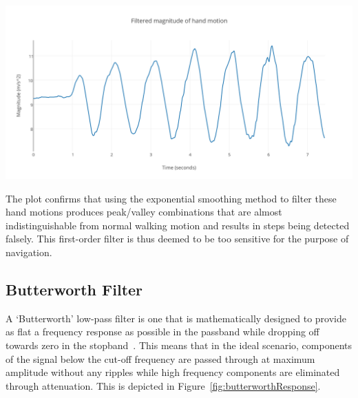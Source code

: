 \documentclass[12pt,a4paper,notitlepage]{report}
\begin{document}
\begin{center}
\includegraphics[scale=0.9]{images/complementaryFilterHandMotionMagnitude.png}
\label{fig:complementaryFilterHandMotionMagnitude}
\end{center}
The plot confirms that using the exponential smoothing method to filter these hand motions produces peak/valley combinations that are almost indistinguishable from normal walking motion and results in steps being detected falsely. This first-order filter is thus deemed to be too sensitive for the purpose of navigation. 

\subsection*{Butterworth Filter}

A `Butterworth' low-pass filter is one that is mathematically designed to provide as flat a frequency response as possible in the passband while dropping off towards zero in the stopband~\cite[p.17]{bianchi2007electronic}. This means that in the ideal scenario, components of the signal below the cut-off frequency are passed through at maximum amplitude without any ripples while high frequency components are eliminated through attenuation. This is depicted in Figure~\ref{fig:butterworthResponse}.   
\end{document}

